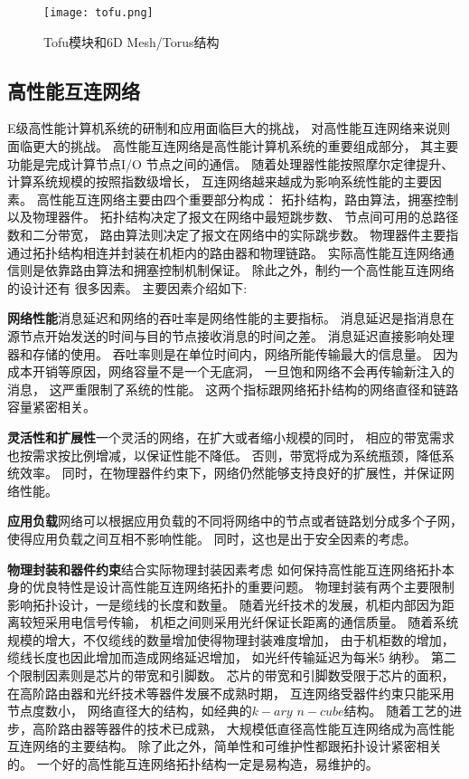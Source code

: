 \begin{figure}[htp]
\centering
\texttt{[image: tofu.png]}
\caption{Tofu模块和6D Mesh/Torus结构}
\label{tofuto}
\end{figure}

\subsection{高性能互连网络}

E级高性能计算机系统的研制和应用面临巨大的挑战，
对高性能互连网络来说则面临更大的挑战。
高性能互连网络是高性能计算机系统的重要组成部分，
其主要功能是完成计算节点I/O 节点之间的通信。
随着处理器性能按照摩尔定律提升、
计算系统规模的按照指数级增长，
互连网络越来越成为影响系统性能的主要因素。
高性能互连网络主要由四个重要部分构成：
拓扑结构，路由算法，拥塞控制以及物理器件。
拓扑结构决定了报文在网络中最短跳步数、
节点间可用的总路径数和二分带宽，
路由算法则决定了报文在网络中的实际跳步数。
物理器件主要指通过拓扑结构相连并封装在机柜内的路由器和物理链路。
实际高性能互连网络通信则是依靠路由算法和拥塞控制机制保证。
除此之外，制约一个高性能互连网络的设计还有
很多因素。
主要因素介绍如下:

\textbf{网络性能}消息延迟和网络的吞吐率是网络性能的主要指标。
消息延迟是指消息在源节点开始发送的时间与目的节点接收消息的时间之差。
消息延迟直接影响处理器和存储的使用。
吞吐率则是在单位时间内，网络所能传输最大的信息量。
因为成本开销等原因，网络容量不是一个无底洞，
一旦饱和网络不会再传输新注入的消息，
这严重限制了系统的性能。
这两个指标跟网络拓扑结构的网络直径和链路容量紧密相关。

\textbf{灵活性和扩展性}一个灵活的网络，在扩大或者缩小规模的同时，
相应的带宽需求也按需求按比例增减，以保证性能不降低。
否则，带宽将成为系统瓶颈，降低系统效率。
同时，在物理器件约束下，网络仍然能够支持良好的扩展性，并保证网络性能。

\textbf{应用负载}网络可以根据应用负载的不同将网络中的节点或者链路划分成多个子网，
使得应用负载之间互相不影响性能。
同时，这也是出于安全因素的考虑。

\textbf{物理封装和器件约束}结合实际物理封装因素考虑
如何保持高性能互连网络拓扑本身的优良特性是设计高性能互连网络拓扑的重要问题。
物理封装有两个主要限制影响拓扑设计，一是缆线的长度和数量。
随着光纤技术的发展，机柜内部因为距离较短采用电信号传输，
机柜之间则采用光纤保证长距离的通信质量。
随着系统规模的增大，不仅缆线的数量增加使得物理封装难度增加，
由于机柜数的增加，缆线长度也因此增加而造成网络延迟增加，
如光纤传输延迟为每米5 纳秒。
第二个限制因素则是芯片的带宽和引脚数。
芯片的带宽和引脚数受限于芯片的面积，
在高阶路由器和光纤技术等器件发展不成熟时期，
互连网络受器件约束只能采用节点度数小，
网络直径大的结构，如经典的$k-ary$ $n-cube$结构。
随着工艺的进步，高阶路由器等器件的技术已成熟，
大规模低直径高性能互连网络成为高性能互连网络的主要结构。
除了此之外，简单性和可维护性都跟拓扑设计紧密相关的。
一个好的高性能互连网络拓扑结构一定是易构造，易维护的。

